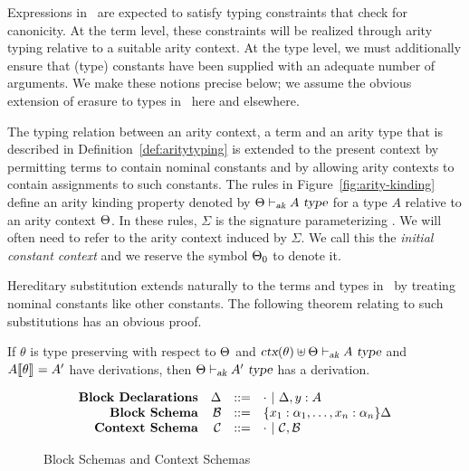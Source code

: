 Expressions in \logic\ are expected to
satisfy typing constraints that check for canonicity.
%
At the term level, these constraints will be realized through arity
typing relative to a suitable arity context.
%
At the type level, we must additionally ensure that (type) constants
have been supplied with an adequate number of arguments.
%
We make these notions precise below; we assume the obvious extension
of erasure to types in \logic\ here and elsewhere.
%
\begin{definition}
The typing relation between an arity context, a term and an arity type
that is described in Definition~\ref{def:aritytyping} is extended to
the present context by permitting terms to contain nominal constants
and by allowing arity contexts to contain assignments to such
constants.
%
The rules in Figure~\ref{fig:arity-kinding} define an arity kinding
property denoted by $\Theta \vdash_{\mbox{\sl \scriptsize ak}} A\ \mbox{\sl type}$ for a type $A$ relative to
an arity context $\Theta$.
%
In these rules, $\Sigma$ is the signature parameterizing \logic.
%
We will often need to refer to the arity context induced by $\Sigma$.
%
We call this the \emph{initial constant context} and we reserve the symbol
$\Theta_0$ to denote it.
\end{definition}

Hereditary substitution extends naturally to the terms and types in
\logic\ by treating nominal constants like other constants.
%
The following theorem relating to such substitutions has an obvious
proof.  

\begin{theorem}\label{th:aritysubs-ty}
If $\theta$ is type preserving with respect to $\Theta$ and
$\mbox{\sl ctx}(\theta) \uplus \Theta \vdash_{\mbox{\sl \scriptsize ak}} A\ \mbox{\sl type}$ and
$A\llbracket {\theta} \rrbracket_{} = A'$ have derivations, then
$\Theta \vdash_{\mbox{\sl \scriptsize ak}} A'\ \mbox{\sl type}$ has a derivation.
\end{theorem}

\begin{figure}[tbhp]
  \[\begin{array}{rrcl}
\mbox{\bf Block Declarations} & \Delta & ::= & \emptybb\ \vert\ \Delta, y : A \\
\mbox{\bf Block Schema}   & \mathcal{B} & ::= & \{x_1:\alpha_1,\ldots, x_n:\alpha_n\}\Delta\\
\mbox{\bf Context Schema} & \mathcal{C} & ::= & \emptycs\ \vert\ \mathcal{C}, \mathcal{B}
\end{array}\]
\caption{Block Schemas and Context Schemas}
\label{fig:context-schemas}
\end{figure}


